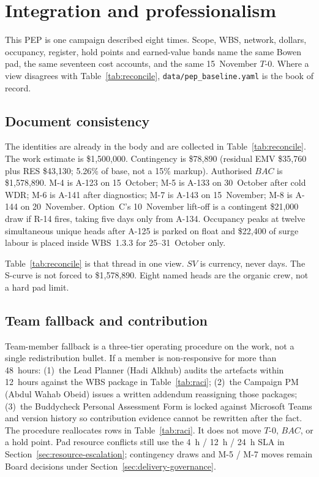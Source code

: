 \section{Integration and professionalism}
\label{sec:integration}

This PEP is one campaign described eight times. Scope, WBS, network, dollars, occupancy, register, hold points and earned-value bands name the same Bowen pad, the same seventeen cost accounts, and the same 15~November $T$-0. Where a view disagrees with Table~\ref{tab:reconcile}, \texttt{data/pep\_baseline.yaml} is the book of record.

\subsection{Document consistency}
\label{sec:integration-consistency}

The identities are already in the body and are collected in Table~\ref{tab:reconcile}. The work estimate is \$1{,}500{,}000. Contingency is \$78{,}890 (residual EMV \$35{,}760 plus RES \$43{,}130; 5.26\% of base, not a 15\% markup). Authorised $BAC$ is \$1{,}578{,}890. M-4 is A-123 on 15~October; M-5 is A-133 on 30~October after cold WDR; M-6 is A-141 after diagnostics; M-7 is A-143 on 15~November; M-8 is A-144 on 20~November. Option~C's 10~November lift-off is a contingent \$21{,}000 draw if R-14 fires, taking five days only from A-134. Occupancy peaks at twelve simultaneous unique heads after A-125 is parked on float and \$22{,}400 of surge labour is placed inside WBS~1.3.3 for 25--31~October only.

Table~\ref{tab:reconcile} is that thread in one view. $SV$ is currency, never days. The S-curve is not forced to \$1{,}578{,}890. Eight named heads are the organic crew, not a hard pad limit.



\subsection{Team fallback and contribution}
\label{sec:integration-fallback}

Team-member fallback is a three-tier operating procedure on the work, not a single redistribution bullet. If a member is non-responsive for more than 48~hours: (1)~the Lead Planner (Hadi Alkhub) audits the artefacts within 12~hours against the WBS package in Table~\ref{tab:raci}; (2)~the Campaign PM (Abdul Wahab Obeid) issues a written addendum reassigning those packages; (3)~the Buddycheck Personal Assessment Form is locked against Microsoft Teams and version history so contribution evidence cannot be rewritten after the fact. The procedure reallocates rows in Table~\ref{tab:raci}. It does not move $T$-0, $BAC$, or a hold point. Pad resource conflicts still use the 4~h / 12~h / 24~h SLA in Section~\ref{sec:resource-escalation}; contingency draws and M-5 / M-7 moves remain Board decisions under Section~\ref{sec:delivery-governance}.

